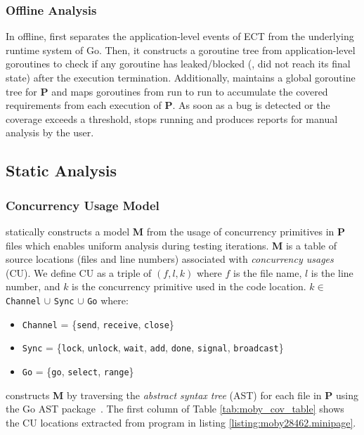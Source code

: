 \subsubsection{Offline Analysis}
In offline, \goat first separates the application-level events of ECT from the underlying runtime system of Go.
%
Then, it constructs a goroutine tree from application-level goroutines to check if any goroutine has leaked/blocked (\ie, did not reach its final state) after the execution termination.
%
Additionally, \goat maintains a global goroutine tree for \textbf{P} and maps goroutines from run to run to accumulate the covered requirements from each execution of \textbf{P}.
%
As soon as a bug is detected or the coverage exceeds a threshold, \goat stops running and produces reports for manual analysis by the user.
%

\subsection{Static Analysis}
\label{sec:ch4_static_analysis}

\subsubsection{Concurrency Usage Model}
\goat statically constructs a model \textbf{M} from the usage of concurrency primitives in \textbf{P} files which enables uniform analysis during testing iterations.
%
\textbf{M} is a table of source locations (files and line numbers) associated with \textit{concurrency usages} (CU).
%
We define CU as a triple of $(f,l,k)$ where $f$ is the file name, $l$ is the line number, and $k$ is the concurrency primitive used in the code location.
$k\in$ \texttt{Channel} $\cup$ \texttt{Sync} $\cup$ \texttt{Go} where:
\begin{itemize}
  \item \texttt{Channel} = \{\texttt{send}, \texttt{receive}, \texttt{close}\}
  \item \texttt{Sync} = \{\texttt{lock}, \texttt{unlock}, \texttt{wait}, \texttt{add}, \texttt{done}, \texttt{signal}, \texttt{broadcast}\}
  \item \texttt{Go} = \{\texttt{go}, \texttt{select}, \texttt{range}\}
\end{itemize}

\goat constructs \textbf{M} by traversing the \textit{abstract syntax tree} (AST) for each file in \textbf{P} using the Go AST package~\cite{go-package-ast}.
%
The first column of Table \ref{tab:moby_cov_table} shows the CU locations extracted from program in listing \ref{listing:moby28462.minipage}.

